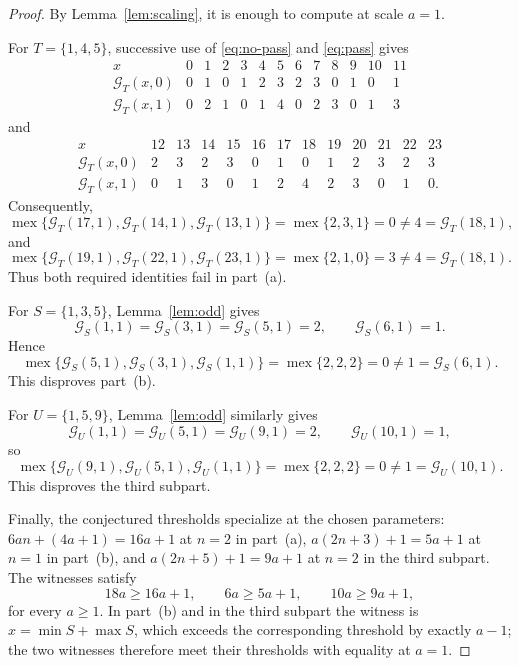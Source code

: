\documentclass[11pt]{amsart}
\theoremstyle{remark}
\newcommand{\mex}{\operatorname{mex}}
\newcommand{\G}{\mathcal{G}}
\begin{document}
\begin{proof}
By Lemma~\ref{lem:scaling}, it is enough to compute at scale $a=1$.

For $T=\{1,4,5\}$, successive use of \eqref{eq:no-pass} and
\eqref{eq:pass} gives
\[
\begin{array}{c|rrrrrrrrrrrr}
x&0&1&2&3&4&5&6&7&8&9&10&11\\ \hline
\G_T(x,0)&0&1&0&1&2&3&2&3&0&1&0&1\\
\G_T(x,1)&0&2&1&0&1&4&0&2&3&0&1&3
\end{array}
\]
and
\[
\begin{array}{c|rrrrrrrrrrrr}
x&12&13&14&15&16&17&18&19&20&21&22&23\\ \hline
\G_T(x,0)&2&3&2&3&0&1&0&1&2&3&2&3\\
\G_T(x,1)&0&1&3&0&1&2&4&2&3&0&1&0.
\end{array}
\]
Consequently,
\[
\mex\{\G_T(17,1),\G_T(14,1),\G_T(13,1)\}
 =\mex\{2,3,1\}
 =0
 \neq4
 =\G_T(18,1),
\]
and
\[
\mex\{\G_T(19,1),\G_T(22,1),\G_T(23,1)\}
 =\mex\{2,1,0\}
 =3
 \neq4
 =\G_T(18,1).
\]
Thus both required identities fail in part~(a).

For $S=\{1,3,5\}$, Lemma~\ref{lem:odd} gives
\[
\G_S(1,1)=\G_S(3,1)=\G_S(5,1)=2,
\qquad
\G_S(6,1)=1.
\]
Hence
\[
\mex\{\G_S(5,1),\G_S(3,1),\G_S(1,1)\}
 =\mex\{2,2,2\}
 =0
 \neq1
 =\G_S(6,1).
\]
This disproves part~(b).

For $U=\{1,5,9\}$, Lemma~\ref{lem:odd} similarly gives
\[
\G_U(1,1)=\G_U(5,1)=\G_U(9,1)=2,
\qquad
\G_U(10,1)=1,
\]
so
\[
\mex\{\G_U(9,1),\G_U(5,1),\G_U(1,1)\}
 =\mex\{2,2,2\}
 =0
 \neq1
 =\G_U(10,1).
\]
This disproves the third subpart.

Finally, the conjectured thresholds specialize at the chosen
parameters: $6an+(4a+1)=16a+1$ at $n=2$ in part~(a),
$a(2n+3)+1=5a+1$ at $n=1$ in part~(b), and $a(2n+5)+1=9a+1$ at $n=2$
in the third subpart. The witnesses satisfy
\[
18a\geq16a+1,
\qquad
6a\geq5a+1,
\qquad
10a\geq9a+1,
\]
for every $a\geq1$. In part~(b) and in the third subpart the witness is
$x=\min S+\max S$, which exceeds the corresponding threshold by exactly
$a-1$; the two witnesses therefore meet their thresholds with equality
at $a=1$.
\end{proof}
\end{document}
